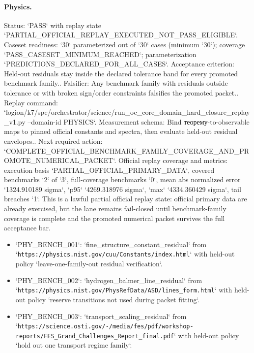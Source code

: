 \paragraph{Physics.}
Status: `PASS` with replay state `PARTIAL\_OFFICIAL\_REPLAY\_EXECUTED\_NOT\_PASS\_ELIGIBLE`.
Caseset readiness: `30` parameterized out of `30` cases (minimum `30`); coverage `PASS\_CASESET\_MINIMUM\_REACHED`; parameterization `PREDICTIONS\_DECLARED\_FOR\_ALL\_CASES`.
Acceptance criterion: Held-out residuals stay inside the declared tolerance band for every promoted benchmark family..
Falsifier: Any benchmark family with residuals outside tolerance or with broken sign/order constraints falsifies the promoted packet..
Replay command: `logion/k7/spe/orchestrator/science/run\_oc\_core\_domain\_hard\_closure\_replay\_v1.py --domain-id PHYSICS`.
Measurement schema: Bind теорему-to-observable maps to pinned official constants and spectra, then evaluate held-out residual envelopes..
Next required action: `COMPLETE\_OFFICIAL\_BENCHMARK\_FAMILY\_COVERAGE\_AND\_PROMOTE\_NUMERICAL\_PACKET`.
Official replay coverage and metrics: execution basis `PARTIAL\_OFFICIAL\_PRIMARY\_DATA`, covered benchmarks `2` of `3`, full-coverage benchmarks `0`, mean abs normalized error `1324.910189 sigma`, `p95` `4269.318976 sigma`, `max` `4334.360429 sigma`, tail breaches `1`.
This is a lawful partial official replay state: official primary data are already exercised, but the lane remains fail-closed until benchmark-family coverage is complete and the promoted numerical packet survives the full acceptance bar.
\begin{itemize}
\item `PHY\_BENCH\_001`: `fine\_structure\_constant\_residual` from `\texttt{https://physics.nist.gov/cuu/Constants/index.html}` with held-out policy `leave-one-family-out residual verification`.
\item `PHY\_BENCH\_002`: `hydrogen\_balmer\_line\_residual` from `\texttt{https://physics.nist.gov/PhysRefData/ASD/lines\_form.html}` with held-out policy `reserve transitions not used during packet fitting`.
\item `PHY\_BENCH\_003`: `transport\_scaling\_residual` from `\texttt{https://science.osti.gov/-/media/fes/pdf/workshop-reports/FES\_Grand\_Challenges\_Report\_final.pdf}` with held-out policy `hold out one transport regime family`.
\end{itemize}

